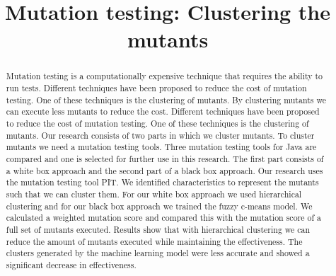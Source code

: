 \documentclass[conference,draftclsnofoot,onecolumn]{IEEEtran}
\begin{document}
\title{Mutation testing: Clustering the mutants}


\author{

\and
{}
\and
{}
}

\maketitle
\begin{abstract}
Mutation testing is a computationally expensive technique that requires the ability to run tests.
Different techniques have been proposed to reduce the cost of mutation testing.
One of these techniques is the clustering of mutants.
By clustering mutants we can execute less mutants to reduce the cost.
Different techniques have been proposed to reduce the cost of mutation testing.
One of these techniques is the clustering of mutants.
Our research consists of two parts in which we cluster mutants.
To cluster mutants we need a mutation testing tools.
Three mutation testing tools for Java are compared and one is selected for further use in this research.
The first part consists of a white box approach and the second part of a black box approach.
Our research uses the mutation testing tool PIT.
We identified characteristics to represent the mutants such that we can cluster them.
For our white box approach we used hierarchical clustering and for our black box approach we trained the fuzzy c-means  model.
We calculated a weighted mutation score and compared this with the mutation score of a full set of mutants executed.
Results show that with hierarchical clustering we can reduce the amount of mutants executed while maintaining the effectiveness.
The clusters generated by the machine learning model were less accurate and showed a significant decrease in effectiveness.
\end{abstract}
\end{document}
